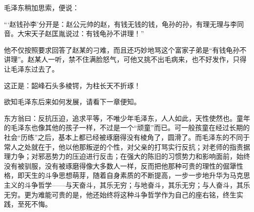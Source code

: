 \documentclass[../../dazhuan.tex]{subfiles}
\begin{document}
毛泽东稍加思索，便说：

“‘赵钱孙李’分开是：赵公元帅的赵，有钱无钱的钱，龟孙的孙，有理无理与李同音。大宋天子赵匡胤说过：有钱龟孙不讲理！”

他不仅按照要求回答了赵某的刁难，而且还巧妙地骂这个富家子弟是“有钱龟孙不讲理”。赵某人一听，禁不住满脸怒气，可他又挑不出毛病来，也不好发作，只得让毛泽东过去了。

这正是：韶峰石头多棱锷，为柱长天不折琢！

欲知毛泽东后来如何发展，请看下一章便知。

东方翁曰：反抗压迫，追求平等，不唯少年毛泽东，人人如此，天性使然也。童年的毛泽东也像其他的孩子一样，不过是一个“顽童”而已。可一般孩童在经过长期的社会“历练”之后，基本上都已经被琢磨得没有棱角了，圆滑了。而毛泽东的不同于常人之处就在于，他以他那叛逆的个性，对父亲的打骂实行反抗；对老师的指责据理力争；对邪恶势力的压迫进行反击；在强大的陈旧的习惯势力和影响面前，始终没有被驯服，没有被琢磨得像大多数人一样，反而把他那种可贵的理性的倔犟性格，即天生的斗争思想萌芽，随着自身素质的不断提高，一步一步地升华为马克思主义的斗争哲学——与天奋斗，其乐无穷；与地奋斗，其乐无穷；与人奋斗，其乐无穷。更为难能可贵的是，他还始终将这种斗争哲学作为自己的座右铭，终生实践，至死不悔。
\end{document}
